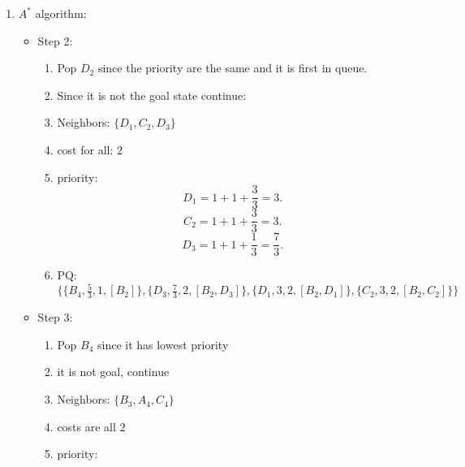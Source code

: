 \documentclass[a4paper]{article}
\begin{document}
\begin{enumerate}
\begin{proof}
\begin{align*}
  & \frac{\mid s_x - g_x \mid + \mid s_y - g_y \mid }{n-1} \leq 1 + \frac{\mid s'_x - g_x \mid + \mid s'_y - g_y \mid }{n-1} \\
  &  \frac{ \mid s_x - g_x \mid + \mid s_y - g_y \mid }{n-1} \leq \frac{n-1 + \mid s'_x - g_x \mid + \mid s'_y - g_y \mid }{n-1} 
\end{align*}
Since we know that any move that $s$ makes to  $s'$ will be only in one direction, i.e.  $x$ or  $y$ direction, without loss
of generality, let that move be in the direction of  $y$-axis. Then, $s_x = s_x'$ and the terms cancel.
 \[
\frac{ \mid s_y - g_y \mid }{n-1} \leq \frac{n-1 + \mid s'_y - g_y \mid }{n-1} 
.\]
The above inequality must hold because the maximum value of $\mid s_y - g_y \mid = n-1$ and $\mid s'_y - g_y \mid \geq 0$, so
\[
  \arg\max_{\mid s_y - g_y \mid } [\frac{ \mid s_y - g_y \mid }{n-1} \leq \frac{n-1 + \mid s'_y - g_y \mid }{n-1}] = \frac{n-1}{n-1} \leq \frac{n-1 + \mid s'_y - g_y \mid }{n-1}
.\] 
\end{proof}
\item $A^*$ algorithm:
\begin{itemize}
  \item Step 2:
    \begin{enumerate}
      \item Pop $D_2$ since the priority are the same and it is first in queue.
      \item Since it is not the goal state continue:
      \item Neighbors: $\{D_1, C_2, D_3\}$ 
      \item cost for all: $2$
      \item priority: 
         \[
        D_1 = 1 + 1 + \frac{3}{3} = 3  
        .\] 
        \[
        C_2 = 1 + 1 + \frac{3}{3} = 3
        .\] 
        \[
        D_3 = 1 + 1 + \frac{1}{3} = \frac{7}{3}
        .\] 
      \item PQ: $\{ \{B_4,\frac{5}{3},1,[B_2]\},  \{D_3, \frac{7}{3},2,[B_2,D_3]\}, \{D_1, 3,2,[B_2,D_1]\}, \{C_2,3,2,[B_2,C_2]\}\}$
    \end{enumerate}
  \item Step 3:
    \begin{enumerate}
      \item Pop $B_4$ since it has lowest priority
      \item it is not goal, continue
      \item Neighbors: $\{B_3, A_4,C_4\} $ 
      \item costs are all $2$
      \item priority:

\end{enumerate}
\end{itemize}
\end{enumerate}
\end{document}
